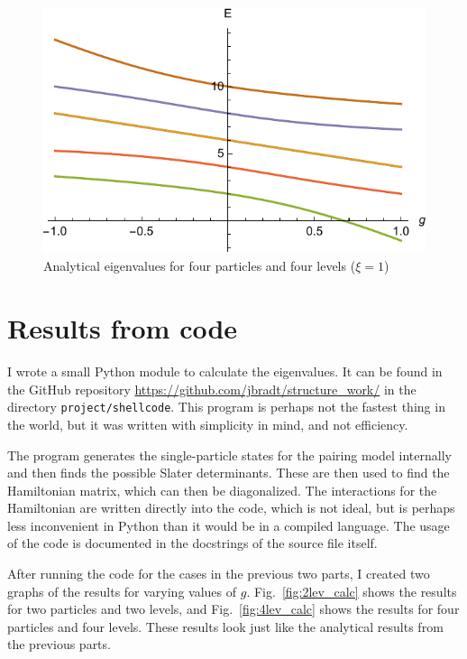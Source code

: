 \documentclass{article}
\begin{document}
	\begin{figure}[p]
		\centering
		\includegraphics{sol4.pdf}
		\caption{Analytical eigenvalues for four particles and four levels ($\xi=1$)}
		\label{fig:4lev_analytical}
	\end{figure}

\section{Results from code}
	
	I wrote a small Python module to calculate the eigenvalues. It can be found in the GitHub repository \url{https://github.com/jbradt/structure_work/} in the directory \texttt{project/shellcode}. This program is perhaps not the fastest thing in the world, but it was written with simplicity in mind, and not efficiency.

	The program generates the single-particle states for the pairing model internally and then finds the possible Slater determinants. These are then used to find the Hamiltonian matrix, which can then be diagonalized. The interactions for the Hamiltonian are written directly into the code, which is not ideal, but is perhaps less inconvenient in Python than it would be in a compiled language. The usage of the code is documented in the docstrings of the source file itself.

	After running the code for the cases in the previous two parts, I created two graphs of the results for varying values of $g$. Fig.~\ref{fig:2lev_calc} shows the results for two particles and two levels, and Fig.~\ref{fig:4lev_calc} shows the results for four particles and four levels. These results look just like the analytical results from the previous parts.
\end{document}
